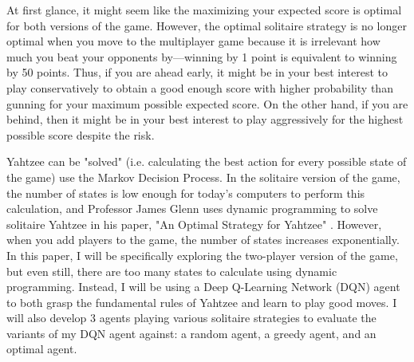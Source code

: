 \documentclass[12pt]{article}
\newcommand{\comment}[1]{}
\begin{document}
At first glance, it might seem like the maximizing your expected score is optimal for both versions of the game. However, the optimal solitaire strategy is no longer optimal when you move to the multiplayer game because it is irrelevant how much you beat your opponents by—winning by 1 point is equivalent to winning by 50 points. Thus, if you are ahead early, it might be in your best interest to play conservatively to obtain a good enough score with higher probability than gunning for your maximum possible expected score. On the other hand, if you are behind, then it might be in your best interest to play aggressively for the highest possible score despite the risk.

Yahtzee can be "solved" (i.e. calculating the best action for every possible state of the game) use the Markov Decision Process. In the solitaire version of the game, the number of states is low enough for today's computers to perform this calculation, and Professor James Glenn uses dynamic programming to solve solitaire Yahtzee in his paper, "An Optimal Strategy for Yahtzee" \cite{glenn}. However, when you add players to the game, the number of states increases exponentially. In this paper, I will be specifically exploring the two-player version of the game, but even still, there are too many states to calculate using dynamic programming. Instead, I will be using a Deep Q-Learning Network (DQN) agent to both grasp the fundamental rules of Yahtzee and learn to play good moves. I will also develop 3 agents playing various solitaire strategies to evaluate the variants of my DQN agent against: a random agent, a greedy agent, and an optimal agent.



\comment {
    The Markov Decision Process can be applied to solve Yahtzee by calculating the best action for every possible state of the game. In the solitaire version of the game, there are roughly $2^{19}$ states to consider, which Professor James Glenn uses dynamic programming to solve in his paper, "An Optimal Strategy for Yahtzee" \cite{glenn}. However, adding players to the game exponentially increases the number of states to consider. In this paper, I will be specifically exploring the two-player version of the game, which has roughly $2^{48}$ states. ${2^{38}}$ states come from the two scorecards that we have to keep track of, each accounting for $2^{19}$ states as stated before. The remaining $2^{10}$ states come from the score difference between the two players that we now have to keep track.
}
\end{document}
